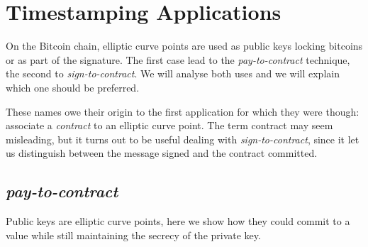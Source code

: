 \section{Timestamping Applications}
On the Bitcoin chain, elliptic curve points are used as public keys locking bitcoins or as part of the signature. The first case lead to the \textit{pay-to-contract} technique, the second to \textit{sign-to-contract}. We will analyse both uses and we will explain which one should be preferred.

These names owe their origin to the first application for which they were though: associate a \textit{contract} to an elliptic curve point. 
The term contract may seem misleading, but it turns out to be useful dealing with \textit{sign-to-contract}, since it let us distinguish between the message signed and the contract committed.

\subsection{\textit{pay-to-contract}}
Public keys are elliptic curve points, here we show how they could commit to a value while still maintaining the secrecy of the private key.

